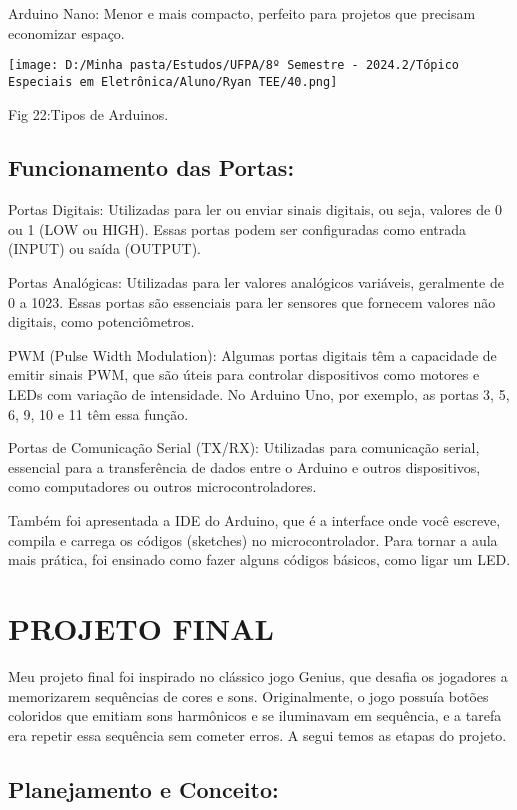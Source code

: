\documentclass[
]{book}
\begin{document}
Arduino Nano: Menor e mais compacto, perfeito para projetos que precisam economizar espaço.

\texttt{[image: D:/Minha pasta/Estudos/UFPA/8º Semestre - 2024.2/Tópico Especiais em Eletrônica/Aluno/Ryan TEE/40.png]}

Fig 22:Tipos de Arduinos.

\section{Funcionamento das Portas:}\label{funcionamento-das-portas}

Portas Digitais: Utilizadas para ler ou enviar sinais digitais, ou seja, valores de 0 ou 1 (LOW ou HIGH). Essas portas podem ser configuradas como entrada (INPUT) ou saída (OUTPUT).

Portas Analógicas: Utilizadas para ler valores analógicos variáveis, geralmente de 0 a 1023. Essas portas são essenciais para ler sensores que fornecem valores não digitais, como potenciômetros.

PWM (Pulse Width Modulation): Algumas portas digitais têm a capacidade de emitir sinais PWM, que são úteis para controlar dispositivos como motores e LEDs com variação de intensidade. No Arduino Uno, por exemplo, as portas 3, 5, 6, 9, 10 e 11 têm essa função.

Portas de Comunicação Serial (TX/RX): Utilizadas para comunicação serial, essencial para a transferência de dados entre o Arduino e outros dispositivos, como computadores ou outros microcontroladores.

Também foi apresentada a IDE do Arduino, que é a interface onde você escreve, compila e carrega os códigos (sketches) no microcontrolador. Para tornar a aula mais prática, foi ensinado como fazer alguns códigos básicos, como ligar um LED.

\chapter{PROJETO FINAL}\label{projeto-final}

Meu projeto final foi inspirado no clássico jogo Genius, que desafia os jogadores a memorizarem sequências de cores e sons. Originalmente, o jogo possuía botões coloridos que emitiam sons harmônicos e se iluminavam em sequência, e a tarefa era repetir essa sequência sem cometer erros. A segui temos as etapas do projeto.

\section{Planejamento e Conceito:}\label{planejamento-e-conceito}
\end{document}
